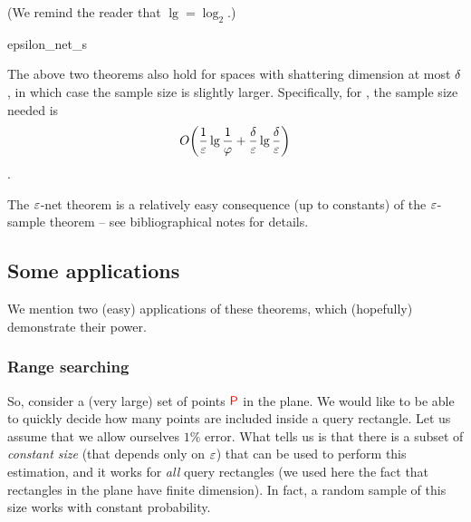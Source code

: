 (We remind the reader that $\lg=\log_2$.)



\begin{fragment}{epsilon_net_s}
    \begin{remark}
        The above two theorems also hold for spaces with shattering
        dimension at most $\delta$, in which case the sample size is
        slightly larger.  Specifically, for , the
        sample size needed is
        \begin{equation*}
            \ds O\pth{ \frac{1}{\eps} \lg
               \frac{1}{\BadProb} + \frac{\Dim}{\eps}\lg \frac{\Dim}{\eps}
            }
        \end{equation*}.        
    \end{remark}
\end{fragment}


\begin{remark}
    The ${\varepsilon}$-net theorem is a relatively easy consequence (up to
    constants) of the ${\varepsilon}$-sample theorem -- see bibliographical
    notes for details.
\end{remark}


\subsection{Some applications}

We mention two (easy) applications of these theorems, which
(hopefully) demonstrate their power.

\subsubsection{Range searching}
So, consider a (very large) set of points ${{\textcolor{red}{\mathsf{P}}}}$ in the plane.  We
would like to be able to quickly decide how many points are included
inside a query rectangle. Let us assume that we allow ourselves $1\%$
error.  What  tells us is that there is a
subset of \emph{constant size} (that depends only on ${\varepsilon}$) that can
be used to perform this estimation, and it works for \emph{all} query
rectangles (we used here the fact that rectangles in the plane have
finite \VC dimension). In fact, a random sample of this size works
with constant probability.

